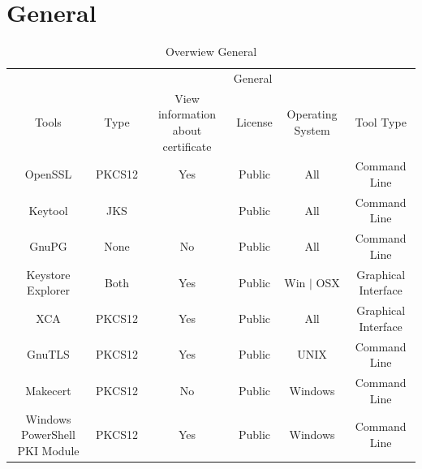 \documentclass[10pt, a4paper]{report}
\begin{document}
\section{General}
\begin{table}[h!]
\centering
\caption{Overwiew General}
\label{my-label}
\begin{adjustbox}{max width=\textwidth}
\begin{tabular}{|c|c|c|c|c|c|}
\hline
                              & \multicolumn{5}{c|}{General}                                                                                   \\ \cline{2-6} 
\multirow{-2}{*}{Tools}       & Type   & View information about certificate                 & License & Operating System                        & Tool Type           \\ \hline
OpenSSL                       & PKCS12 & \cellcolor[HTML]{34FF34}Yes                        & Public  & \cellcolor[HTML]{34FF34}All             & Command Line        \\ \hline
Keytool                       & JKS    & \cellcolor[HTML]{34FF34}{\color[HTML]{000000} Yes} & Public  & \cellcolor[HTML]{34FF34}All             & Command Line        \\ \hline
GnuPG                         & None   & \cellcolor[HTML]{FE0000}No                         & Public  & \cellcolor[HTML]{34FF34}All             & Command Line        \\ \hline
Keystore Explorer             & Both   & \cellcolor[HTML]{34FF34}Yes                        & Public  & \cellcolor[HTML]{FFC702}Win $\vert$ OSX & Graphical Interface \\ \hline
XCA                           & PKCS12 & \cellcolor[HTML]{34FF34}Yes                        & Public  & \cellcolor[HTML]{34FF34}All             & Graphical Interface \\ \hline
GnuTLS                        & PKCS12 & \cellcolor[HTML]{34FF34}Yes                        & Public  & \cellcolor[HTML]{FFC702}UNIX            & Command Line        \\ \hline
Makecert                      & PKCS12 & \cellcolor[HTML]{FE0000}No			    & Public  & \cellcolor[HTML]{FFC702}Windows         & Command Line        \\ \hline
Windows PowerShell PKI Module & PKCS12 & \cellcolor[HTML]{34FF34}Yes			    & Public  & \cellcolor[HTML]{FFC702}Windows         & Command Line        \\ \hline
\end{tabular}
\end{adjustbox}
\end{table}
\end{document}

